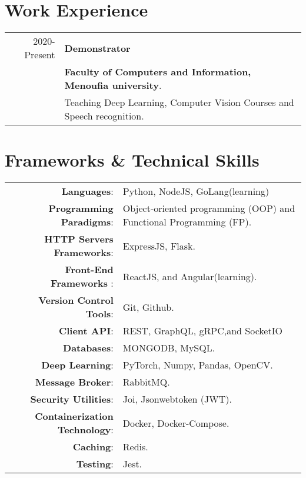 \documentclass[a4paper,10pt]{article} %
\begin{document}
\section{\textbf{Work Experience}}

\begin{tabular}{r|l}
2020-Present  & \textbf{Demonstrator} \\&\textbf{Faculty of Computers and Information, Menoufia university}.\\& Teaching Deep Learning, Computer Vision Courses and Speech recognition.
\\
\end{tabular}

\section{\textbf{Frameworks \& Technical Skills}}


\begin{tabular}{rl}	
    \textbf{Languages}:& Python, NodeJS, GoLang(learning)\\
    \textbf{Programming Paradigms}:&  Object-oriented programming (OOP) and Functional Programming (FP).\\
    \textbf{HTTP Servers Frameworks}:& ExpressJS, Flask.\\
    \textbf{Front-End Frameworks} :& ReactJS, and Angular(learning).\\
    \textbf{Version Control Tools}:& Git, Github.\\
    \textbf{Client API}:& REST, GraphQL, gRPC,and SocketIO\\
    \textbf{Databases}:& MONGODB, MySQL.\\
    \textbf{Deep Learning}:& PyTorch, Numpy, Pandas, OpenCV.\\
    \textbf{Message Broker}:& RabbitMQ.\\
    \textbf{Security Utilities}:& Joi, Jsonwebtoken (JWT).\\ 
    \textbf{Containerization Technology}:& Docker, Docker-Compose.\\
    \textbf{Caching}:& Redis.\\
    \textbf{Testing}:& Jest.\\ 
\end{tabular}
\end{document}
